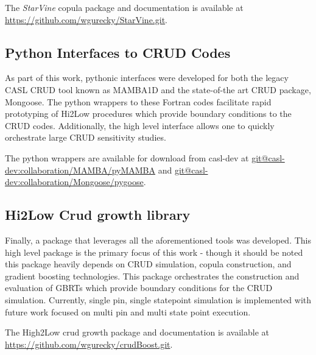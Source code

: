 The \emph{StarVine} copula package and documentation is available at \url{https://github.com/wgurecky/StarVine.git}.

\subsection{Python Interfaces to CRUD Codes}

As part of this work, pythonic interfaces were developed for both the legacy CASL CRUD tool known as MAMBA1D and the state-of-the art CRUD package, Mongoose.  The python wrappers to these Fortran codes facilitate rapid prototyping of Hi2Low procedures which provide boundary conditions to the CRUD codes.  Additionally, the high level interface allows one to quickly orchestrate large CRUD sensitivity studies.

The python wrappers are available for download from casl-dev at \url{git@casl-dev:collaboration/MAMBA/pyMAMBA} and \url{git@casl-dev:collaboration/Mongoose/pygoose}.

\subsection{Hi2Low Crud growth library}

Finally, a package that leverages all the aforementioned tools was developed.  This high level package is the primary focus of this work - though it should be noted this package heavily depends on CRUD simulation, copula construction, and gradient boosting technologies.
This package orchestrates the construction and evaluation of GBRTs which provide boundary conditions for the CRUD simulation.
Currently, single pin, single statepoint simulation is implemented with future work focused on multi pin and multi state point execution.

The High2Low crud growth package and documentation is available at \url{https://github.com/wgurecky/crudBoost.git}.
